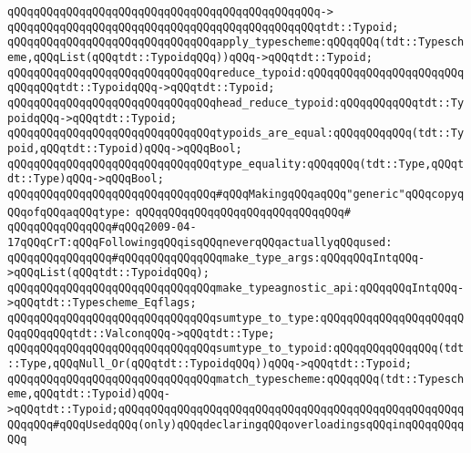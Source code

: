 \verb|qQQqqQQqqQQqqQQqqQQqqQQqqQQqqQQqqQQqqQQqqQQqqQQq->|\newline
\verb|qQQqqQQqqQQqqQQqqQQqqQQqqQQqqQQqqQQqqQQqqQQqqQQqtdt::Typoid;|\newline
\newline
\verb|qQQqqQQqqQQqqQQqqQQqqQQqqQQqqQQqapply_typescheme:qQQqqQQq(tdt::Typescheme,qQQqList(qQQqtdt::TypoidqQQq))qQQq->qQQqtdt::Typoid;|\newline
\newline
\verb|qQQqqQQqqQQqqQQqqQQqqQQqqQQqqQQqreduce_typoid:qQQqqQQqqQQqqQQqqQQqqQQqqQQqqQQqtdt::TypoidqQQq->qQQqtdt::Typoid;|\newline
\verb|qQQqqQQqqQQqqQQqqQQqqQQqqQQqqQQqhead_reduce_typoid:qQQqqQQqqQQqtdt::TypoidqQQq->qQQqtdt::Typoid;|\newline
\verb|qQQqqQQqqQQqqQQqqQQqqQQqqQQqqQQqtypoids_are_equal:qQQqqQQqqQQq(tdt::Typoid,qQQqtdt::Typoid)qQQq->qQQqBool;|\newline
\newline
\verb|qQQqqQQqqQQqqQQqqQQqqQQqqQQqqQQqtype_equality:qQQqqQQq(tdt::Type,qQQqtdt::Type)qQQq->qQQqBool;|\newline
\newline
\verb|qQQqqQQqqQQqqQQqqQQqqQQqqQQqqQQq#qQQqMakingqQQqaqQQq"generic"qQQqcopyqQQqofqQQqaqQQqtype:|\newline
\verb|qQQqqQQqqQQqqQQqqQQqqQQqqQQqqQQq#|\newline
\verb|qQQqqQQqqQQqqQQq#qQQq2009-04-17qQQqCrT:qQQqFollowingqQQqisqQQqneverqQQqactuallyqQQqused:|\newline
\verb|qQQqqQQqqQQqqQQq#qQQqqQQqqQQqqQQqmake_type_args:qQQqqQQqIntqQQq->qQQqList(qQQqtdt::TypoidqQQq);|\newline
\verb|qQQqqQQqqQQqqQQqqQQqqQQqqQQqqQQqmake_typeagnostic_api:qQQqqQQqIntqQQq->qQQqtdt::Typescheme_Eqflags;|\newline
\newline
\verb|qQQqqQQqqQQqqQQqqQQqqQQqqQQqqQQqsumtype_to_type:qQQqqQQqqQQqqQQqqQQqqQQqqQQqqQQqtdt::ValconqQQq->qQQqtdt::Type;|\newline
\verb|qQQqqQQqqQQqqQQqqQQqqQQqqQQqqQQqsumtype_to_typoid:qQQqqQQqqQQqqQQq(tdt::Type,qQQqNull_Or(qQQqtdt::TypoidqQQq))qQQq->qQQqtdt::Typoid;|\newline
\newline
\verb|qQQqqQQqqQQqqQQqqQQqqQQqqQQqqQQqmatch_typescheme:qQQqqQQq(tdt::Typescheme,qQQqtdt::Typoid)qQQq->qQQqtdt::Typoid;qQQqqQQqqQQqqQQqqQQqqQQqqQQqqQQqqQQqqQQqqQQqqQQqqQQqqQQqqQQq#qQQqUsedqQQq(only)qQQqdeclaringqQQqoverloadingsqQQqinqQQqqQQqqQQq|\newline
